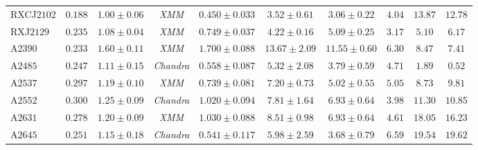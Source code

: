 \documentclass[iop, apj]{emulateapj}
\newcommand{\?}{\stackrel{?}{=}}
\begin{document}
\begin{table*}[H]
\begin{center}
\begin{tabular}{lccccccccc}
 RXCJ$2102$ &$0.188$ &$1.00\pm0.06$ &{\it XMM} &$0.450\pm0.033$ &$3.52\pm0.61$ &$3.06\pm0.22$ & $4.04$ & $13.87$ & $12.78$ \\%
 RXJ$2129$ &$0.235$ &$1.08\pm0.04$ &{\it XMM} &$0.749\pm0.037$  &$4.22\pm0.16$ &$5.09\pm0.25$ & $3.17$ & $5.10$  & $6.17$  \\%
 A$2390$ &$0.233$ &$1.60\pm0.11$ &{\it XMM} &$1.700\pm0.088$  &$13.67\pm2.09$ &$11.55\pm0.60$  & $6.30$ & $8.47$  & $7.41$  \\%
 A$2485$ &$0.247$ &$1.11\pm0.15$ &{\it Chandra}	  &$0.558\pm0.087$  &$5.32\pm2.08$ &$3.79\pm0.59$     & $4.71$ & $1.89$  & $0.52$  \\%
 A$2537$ &$0.297$ &$1.19\pm0.10$ &{\it XMM} &$0.739\pm0.081$   &$7.20\pm0.73$ &$5.02\pm0.55$  & $5.05$ & $8.73$  & $9.81$  \\%
 A$2552$ &$0.300$ &$1.25\pm0.09$ &{\it Chandra}	  &$1.020\pm0.094$  &$7.81\pm1.64$ &$6.93\pm0.64$     & $3.98$ & $11.30$ & $10.85$ \\%
 A$2631$ &$0.278$ &$1.20\pm0.09$ &{\it XMM} &$1.030\pm0.088$  &$8.51\pm0.98$ &$6.93\pm0.64$   & $4.61$ & $18.05$ & $16.23$ \\%
 A$2645$ &$0.251$ &$1.15\pm0.18$ &{\it Chandra}	  &$0.541\pm0.117$  &$5.98\pm2.59$ &$3.68\pm0.79$     & $6.59$ & $19.54$ & $19.62$ \\%
  \hline\hline
   \end{tabular}
  \end{center}
\end{table*}
\end{document}
